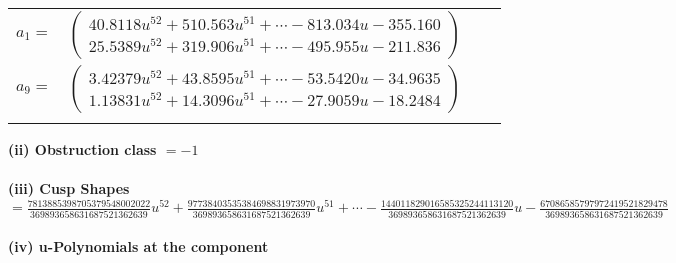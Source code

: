 \documentclass[1p]{elsarticle_modified}
\theoremstyle{definition}
\begin{document}
\begin{tabular}{m{7pt} m{180pt} m{7pt} m{180pt} }
\flushright $a_{1}=$&$\begin{pmatrix}40.8118 u^{52}+510.563 u^{51}+\cdots-813.034 u-355.160\\25.5389 u^{52}+319.906 u^{51}+\cdots-495.955 u-211.836\end{pmatrix}$ \\
\flushright $a_{9}=$&$\begin{pmatrix}3.42379 u^{52}+43.8595 u^{51}+\cdots-53.5420 u-34.9635\\1.13831 u^{52}+14.3096 u^{51}+\cdots-27.9059 u-18.2484\end{pmatrix}$\\&\end{tabular}
\flushleft \textbf{(ii) Obstruction class $= -1$}\\~\\
\flushleft \textbf{(iii) Cusp Shapes $= \frac{7813885398705379548002022}{369893658631687521362639} u^{52}+\frac{97738403535384698831973970}{369893658631687521362639} u^{51}+\cdots-\frac{144011829016585325244113120}{369893658631687521362639} u-\frac{67086585797972419521829478}{369893658631687521362639}$}\\~\\
\newpage\renewcommand{\arraystretch}{1}
\flushleft \textbf{(iv) u-Polynomials at the component}\newline \\
\end{document}
